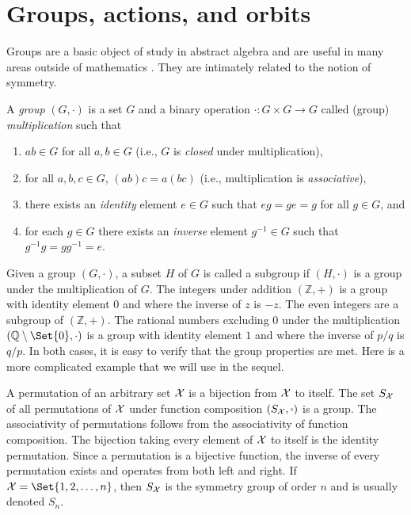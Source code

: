 \chapter{\label{app:def}Groups, actions, and orbits}
\setcounter{example}{0}

Groups are a basic object of study in abstract algebra and
are useful in many areas outside of mathematics \cite{armstrong1997groups, dummit2003abstract, lang2002algebra}.  They are intimately
related to the notion of symmetry.

\begin{definition}
A \emph{group} $(G, \cdot)$ is a set $G$ and a binary operation $\cdot: G \times G \to G$
called (group) \emph{multiplication} such that
\begin{enumerate}
\item $ab \in G$ for all $a, b \in G$ (i.e., $G$ is \emph{closed} under multiplication),
\item for all $a, b, c \in G$, $(ab)c = a(bc)$ (i.e., multiplication is \emph{associative}),
\item there exists an \emph{identity} element $e \in G$ such that $eg = ge = g$ for all $g \in G$, and
\item for each $g \in G$ there exists an \emph{inverse} element $g^{-1} \in G$ such that $g^{-1}g = gg^{-1} = e$.
\end{enumerate}
\end{definition}

Given a group $(G, \cdot)$, a subset $H$ of $G$ is called a subgroup if $(H, \cdot)$ is a group
under the multiplication of $G$.  The integers under
addition $(\mathbb{Z}, +)$ is a group with identity element $0$ and where the
inverse of $z$ is $-z$.  The even integers are a subgroup of $(\mathbb{Z}, +)$.
The rational numbers excluding $0$ under the multiplication
$(\mathbb{Q}\setminus \Set{0}, \cdot)$ is a group with identity element $1$ and
where the inverse of $p/q$ is $q/p$. In both cases, it is easy to verify that
the group properties are met.  Here is a more complicated example that we will
use in the sequel. 

\begin{example}
A permutation of an arbitrary set $\mathcal{X}$ is a bijection from $\mathcal{X}$ to itself.  The
set $S_{\mathcal{X}}$ of all permutations of $\mathcal{X}$ under function composition
$(S_\CX, \smallcirc)$ is a group.  The associativity of permutations follows from the
associativity of function composition.  The bijection taking every element of
$\mathcal{X}$ to itself is the identity permutation. Since a permutation is a bijective function, the
inverse of every permutation exists and operates from both left and right.  
If $\CX = \Set{1, 2, \dots, n}$, then $S_{\mathcal{X}}$ is the symmetry group of order $n$
and is usually denoted $S_n$.
\end{example}


